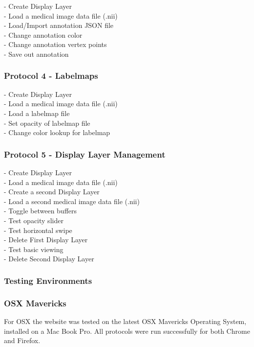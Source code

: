 \documentclass[a4paper,11pt,twoside]{article}
\begin{document}
- Create Display Layer\\
- Load a medical image data file (.nii)\\
- Load/Import annotation JSON file\\
- Change annotation color\\
- Change annotation vertex points\\
- Save out annotation


\subsubsection*{Protocol 4 - Labelmaps }

- Create Display Layer\\
- Load a medical image data file (.nii)\\
- Load a labelmap file\\
- Set opacity of labelmap file\\
- Change color lookup for labelmap

\subsubsection*{Protocol 5 - Display Layer Management }

- Create Display Layer\\
- Load a medical image data file (.nii)\\
- Create a second Display Layer\\
- Load a second medical image data file (.nii)\\
- Toggle between buffers\\
- Test opacity slider\\
- Test horizontal swipe\\
- Delete First Display Layer\\
- Test basic viewing\\
- Delete Second Display Layer




\subsubsection{Testing Environments}


\subsubsection*{OSX Mavericks}

For OSX the website was tested on the latest OSX Mavericks Operating System, installed on a Mac Book Pro. All protocols were run successfully for both Chrome and Firefox.\\
\end{document}
